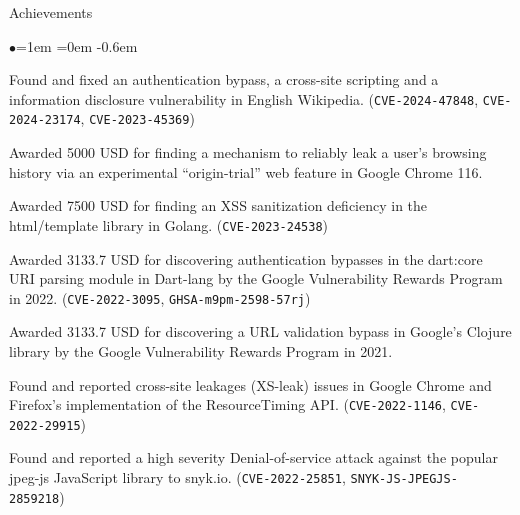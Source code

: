 \documentclass{resume} %
\begin{document}
\begin{rSection}{Achievements}
\begin{list}{$\bullet$}{\leftmargin=1em \itemindent=0em}
\itemsep -0.6em
\item Found and fixed an authentication bypass, a cross-site scripting and a information disclosure vulnerability in English Wikipedia. (\texttt{CVE-2024-47848}, \texttt{CVE-2024-23174}, \texttt{CVE-2023-45369})
\item Awarded 5000 USD for finding a mechanism to reliably leak a user's browsing history via an experimental ``origin-trial'' web feature in Google Chrome 116.
\item Awarded 7500 USD for finding an XSS sanitization deficiency in the html/template library in Golang. (\texttt{CVE-2023-24538})
\item Awarded 3133.7 USD for discovering authentication bypasses in the dart:core URI parsing module in Dart-lang by the Google Vulnerability Rewards Program in 2022. (\texttt{CVE-2022-3095}, \texttt{GHSA-m9pm-2598-57rj})
\item Awarded 3133.7 USD for discovering a URL validation bypass in Google's Clojure library by the Google Vulnerability Rewards Program in 2021.
\item Found and reported cross-site leakages (XS-leak) issues in Google Chrome and Firefox's implementation of the ResourceTiming API. (\texttt{CVE-2022-1146}, \texttt{CVE-2022-29915})
\item Found and reported a high severity Denial-of-service attack against the popular jpeg-js JavaScript library to snyk.io.
\linebreak(\texttt{CVE-2022-25851}, \texttt{SNYK-JS-JPEGJS-2859218})
\end{list}
\end{rSection}
\end{document}
